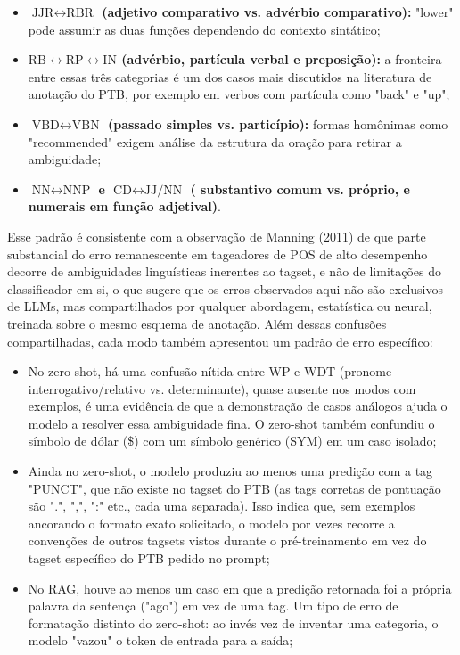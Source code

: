 \documentclass[a4paper,12pt]{article}
\begin{document}
\begin{itemize}
    \item \textbf{$\text{JJR} \leftrightarrow \text{RBR}$ (adjetivo comparativo vs. advérbio comparativo):} "lower" pode assumir as duas funções dependendo do contexto sintático;
    \item \textbf{$\text{RB} \leftrightarrow \text{RP} \leftrightarrow \text{IN}$ (advérbio, partícula verbal e preposição):} a fronteira entre essas três categorias é um dos casos mais discutidos na literatura de anotação do PTB, por exemplo em verbos com partícula como "back" e "up";
    \item \textbf{$\text{VBD} \leftrightarrow \text{VBN}$ (passado simples vs. particípio):} formas homônimas como "recommended" exigem análise da estrutura da oração para retirar a ambiguidade;
    \item \textbf{$\text{NN} \leftrightarrow \text{NNP}$ e $\text{CD} \leftrightarrow \text{JJ/NN}$ ( substantivo comum vs. próprio, e numerais em função adjetival)}.
\end{itemize}

Esse padrão é consistente com a observação de Manning (2011) de que parte substancial do erro remanescente em tageadores de POS de alto desempenho decorre de ambiguidades linguísticas inerentes ao tagset, e não de limitações do classificador em si, o que sugere que os erros observados aqui não são exclusivos de LLMs, mas compartilhados por qualquer abordagem, estatística ou neural, treinada sobre o mesmo esquema de anotação. Além dessas confusões compartilhadas, cada modo também apresentou um padrão de erro específico:

\begin{itemize}
    \item No zero-shot, há uma confusão nítida entre WP e WDT (pronome interrogativo/relativo vs. determinante), quase ausente nos modos com exemplos, é uma evidência de que a demonstração de casos análogos ajuda o modelo a resolver essa ambiguidade fina. O zero-shot também confundiu o símbolo de dólar (\$) com um símbolo genérico (SYM) em um caso isolado;
    \item Ainda no zero-shot, o modelo produziu ao menos uma predição com a tag "PUNCT", que não existe no tagset do PTB (as tags corretas de pontuação são ".", ",", ":" etc., cada uma separada). Isso indica que, sem exemplos ancorando o formato exato solicitado, o modelo por vezes recorre a convenções de outros tagsets vistos durante o pré-treinamento em vez do tagset específico do PTB pedido no prompt;
    \item No RAG, houve ao menos um caso em que a predição retornada foi a própria palavra da sentença ("ago") em vez de uma tag. Um tipo de erro de formatação distinto do zero-shot: ao invés vez de inventar uma categoria, o modelo "vazou" o token de entrada para a saída;
\end{itemize}
\end{document}
